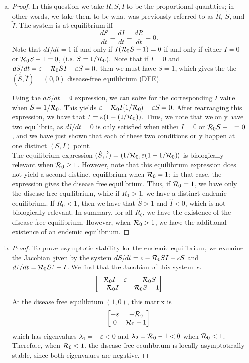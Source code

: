 \documentclass[12pt]{article}\usepackage[]{graphicx}\usepackage[]{color}
\begin{document}
\begin{enumerate}[(a)]
\item \SIRd
{\color{blue}\begin{proof}{\color{magenta}
In this question we take $R, S, I$ to be the proportional quantities; in other words, we take them to be what was previously referred to as $\tilde{R}$, $\tilde{S}$, and $\tilde{I}$.
The system is at equilibrium iff
$$
\frac{dS}{dt} = \frac{dI}{dt} = \frac{dR}{dt} = 0.
$$
Note that $dI/dt =0$ if and only if $I({\cal R}_0 S - 1) = 0$ if and only if either $I = 0$ or ${\cal R}_0 S - 1 = 0$, (i.e. $S = 1/{\cal R}_0$). Note that if  $I = 0$ and $dS/dt = \varepsilon - {\cal R}_0 SI - \varepsilon S = 0$, then we must have $S = 1$, which gives the the $(\hat S, \hat I) = (0, 0)$ disease-free equilibrium (DFE).

Using the $dS/dt=0$ expression, we can solve for the corresponding $I$ value when $S=1/{\cal R}_0$. This yields $\varepsilon - {\cal R}_0I(1/{\cal R}_0)-\varepsilon S=0$. After rearranging this expression, we have that $I=\varepsilon (1-(1/{\cal R}_0))$. Thus, we note that we only have two equilibria, as $dI/dt=0$ is only satisfied when either $I=0$ or ${\cal R}_0S-1=0$, and we have just shown that each of these two conditions only happen at one distinct $(S,I)$ point.\\
The equilibrium expression $(\hat{S}, \hat{I}) = (1/{\cal R}_0, \varepsilon (1- 1/{\cal R}_0))$ is biologically relevant when ${\cal R}_0 \geq 1$. However, note that this equilibrium expression does not yield a second distinct equilibrium when ${\cal R}_0 =1$; in that case, the expression gives the disease free equilibrium. Thus, if ${\cal R}_0 = 1$, we have only the disease free equilibrium, while if  $R_0 >1$, we have a distinct endemic equilibrium. If $R_0 <1$, then we have that $\hat S > 1$ and $ \hat I < 0$, which is not biologically relevant. In summary, for all $R_0$, we have the existence of the disease free equilibrium. However, when ${\cal R}_0 >1$, we have the additional existence of an endemic equilibrium. 
}\end{proof}}

\item \SIRe
{\color{blue}\begin{proof}{\color{magenta}
To prove asymptotic stability for the endemic equilibrium, we examine the Jacobian given by the system $dS/dt=\varepsilon-{\cal R}_0SI-\varepsilon S$ and $dI/dt={\cal R}_0SI-I$. We find that the Jacobian of this system is: 
\begin{equation}
\begin{bmatrix}
-{\cal R}_0I-\varepsilon & -{\cal R}_0S\\
{\cal R}_0 I & {\cal R}_0 S -1
\end{bmatrix}
\end{equation}
At the disease free equilibrium $(1, 0)$, this matrix is
\begin{equation}
\begin{bmatrix}
-\varepsilon 	& -{\cal R}_0\\
0				& {\cal R}_0  -1
\end{bmatrix}
\end{equation}
which has eigenvalues $\lambda_1 = - \varepsilon < 0 $ and $\lambda_2 = {\cal R}_0 - 1 < 0 $ when ${\cal R}_0 < 1$. 
Therefore, when ${\cal R}_0 < 1$, the disease-free equilibrium is locally asymptotically stable, since both eigenvalues are negative.

}
\end{proof}}
\end{enumerate}
\end{document}
